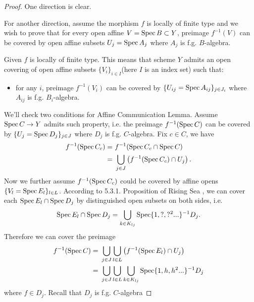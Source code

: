 \begin{proof}
    One direction is clear.

    For another direction, assume the morphism $f$ is locally of finite type and we wish to prove that for every open affine $V=\operatorname{Spec} B\subset Y$, preimage $f^{-1}(V)$ can be covered by open affine subsets $U_j=\operatorname{Spec} A_j$ where $A_j$ is f.g. $B$-algebra. 

    

    Given $f$ is locally of finite type. This means that scheme $Y$ admits an open covering of open  affine subsets $\{V_i\}_{i\in I}$(here $I$ is an index set) such that:
    \begin{itemize}
        \item for any $i$, preimage 
        $f^{-1}(V_i)$ can be covered by $\{U_{ij}=\operatorname{Spec} A_{ij}\}_{j\in J_i}$ where $A_{ij}$ is f.g. $B_i$-algebra. 
    \end{itemize}

    We'll check two conditions for Affine Communication Lemma.
    Assume $\operatorname{Spec} C\to Y$ admits such property, i.e. the preimage $f^{-1}(\operatorname{Spec} C)$ can be covered by $\{U_j=\operatorname{Spec} D_j\}_{j\in J}$ where $D_j$ is f.g. $C$-algebra. Fix $c\in C$, we have 
    \begin{align*}
        f^{-1}(\operatorname{Spec} C_c) =&~ f^{-1}(\operatorname{Spec} C_c\cap \operatorname{Spec} C)\\
        =&~ \bigcup_{j\in J} \left(f^{-1}(\operatorname{Spec} C_c)\cap U_j\right).
    \end{align*}Now we further assume $f^{-1}(\operatorname{Spec} C_c)$ could be covered by affine opens $\{V_l=\operatorname{Spec} E_l\}_{l\in L}$. According to 5.3.1. Proposition of Rising Sea \cite{RaviRisingSea}, we can cover each $\operatorname{Spec} E_l\cap \operatorname{Spec} D_j$ by distinguished open subsets on both sides, i.e. 
    \[\operatorname{Spec} E_l\cap \operatorname{Spec} D_j=\bigcup_{k\in K_{lj}}\operatorname{Spec} \{1,?,?^2...\}^{-1}D_j.\]
    Therefore we can cover the preimage 
    \begin{align*}
        f^{-1}(\operatorname{Spec} C) =&~ \bigcup_{j\in J} \bigcup_{l\in L} \left(f^{-1}(\operatorname{Spec} E_l)\cap U_j\right) \\
        =&~ \bigcup_{j\in J}\bigcup_{l\in L}\bigcup_{k\in K_{lj}}\operatorname{Spec} \{1,h,h^2...\}^{-1}D_j\\
    \end{align*}where $f\in D_j$. Recall that $D_j$ is f.g. $C$-algebra
    
\end{proof}


